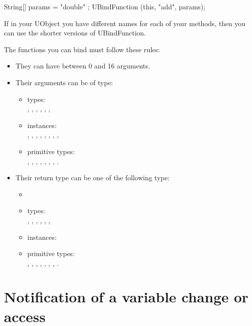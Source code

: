\begin{java}
String[] params = { "double" };
UBindFunction (this, "add", params);
\end{java}

If in your UObject you have different names for each of your methods, then
you can use the shorter versions of UBindFunction.

The functions you can bind must follow these rules:
\begin{itemize}
\item They can have between 0 and 16 arguments.
\item Their arguments can be of type:
  \begin{itemize}
  \item \urbi types:\\
    , , ,
    , , ,
  \item \Java instances:\\
    , ,
    , ,
    , , ,
    , 
  \item \Java primitive types:\\
    , , , , ,
    , , .
  \end{itemize}
\item Their return type can be one of the following type:
  \begin{itemize}
  \item {}
  \item \urbi types:\\
    , , ,
    , , ,
  \item \Java instances:\\
  \item \Java primitive types:\\
    , , , , ,
    , , .
  \end{itemize}
\end{itemize}


\section{Notification of a variable change or access}
\label{sec:uob:apijava:uvar-notify}

